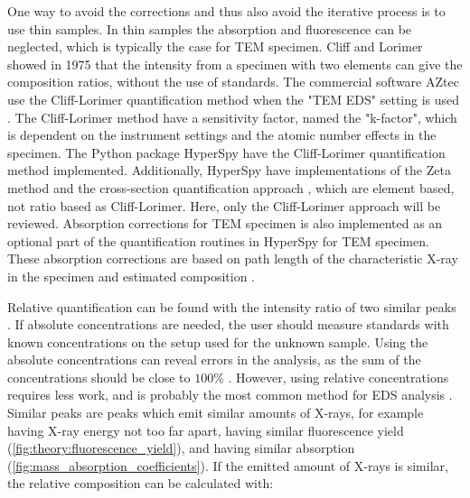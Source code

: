 One way to avoid the corrections and thus also avoid the iterative process is to use thin samples.
In thin samples the absorption and fluorescence can be neglected, which is typically the case for TEM specimen.
Cliff and Lorimer \cite{CL1975} showed in 1975 that the intensity from a specimen with two elements can give the composition ratios, without the use of standards.
The commercial software AZtec \cite{aztec_manual} use the Cliff-Lorimer quantification method when the "TEM EDS" setting is used \cite{oxford_blog_CL}.
The Cliff-Lorimer method have a sensitivity factor, named the "k-factor", which is dependent on the instrument settings and the atomic number effects in the specimen.
The Python package HyperSpy have the Cliff-Lorimer quantification method implemented.
Additionally, HyperSpy have implementations of the Zeta method \cite{watanabe_williams_zeta_2006} and the cross-section quantification approach \cite{MacArthur_crosssection_2016}, which are element based, not ratio based as Cliff-Lorimer. 
Here, only the Cliff-Lorimer approach will be reviewed.
Absorption corrections for TEM specimen is also implemented as an optional part of the quantification routines in HyperSpy for TEM specimen.
These absorption corrections are based on path length of the characteristic X-ray in the specimen and estimated composition \cite{williams_carter_tem_2009}.




Relative quantification can be found with the intensity ratio of two similar peaks \cite{goldstein_scanning_2018}.
If absolute concentrations are needed, the user should measure standards with known concentrations on the setup used for the unknown sample.
Using the absolute concentrations can reveal errors in the analysis, as the sum of the concentrations should be close to $100$\% \cite{goldstein_scanning_2018}.
However, using relative concentrations requires less work, and is probably the most common method for EDS analysis \cite{goldstein_scanning_2018}.
Similar peaks are peaks which emit similar amounts of X-rays, for example having X-ray energy not too far apart, having similar fluorescence yield (\cref{fig:theory:fluorescence_yield}), and having similar absorption (\cref{fig:mass_absorption_coefficients}).
If the emitted amount of X-rays is similar, the relative composition can be calculated with:

